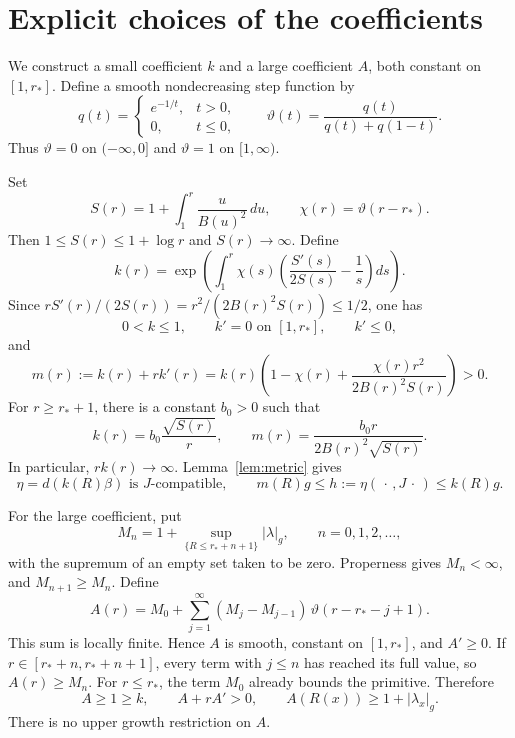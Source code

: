 \documentclass[11pt,a4paper]{article}
\theoremstyle{remark}
\newcommand{\abs}[1]{\lvert #1\rvert}
\numberwithin{equation}{section}
\begin{document}
\section{Explicit choices of the coefficients}

We construct a small coefficient $k$ and a large coefficient $A$, both constant on $[1,r_*]$. Define a smooth nondecreasing step function by
\[
q(t)=\begin{cases}e^{-1/t},&t>0,\\0,&t\le0,\end{cases}
\qquad \vartheta(t)=\frac{q(t)}{q(t)+q(1-t)}.
\]
Thus $\vartheta=0$ on $(-\infty,0]$ and $\vartheta=1$ on $[1,\infty)$.

Set
\begin{equation}\label{eq:S}
S(r)=1+\int_1^r\frac{u}{B(u)^2}\,du,
\qquad \chi(r)=\vartheta(r-r_*).
\end{equation}
Then $1\le S(r)\le1+\log r$ and $S(r)\to\infty$. Define
\begin{equation}\label{eq:k}
\boxed{\displaystyle
k(r)=\exp\left(\int_1^r\chi(s)
\left(\frac{S'(s)}{2S(s)}-\frac1s\right)ds\right).}
\end{equation}
Since $rS'(r)/(2S(r))=r^2/(2B(r)^2S(r))\le1/2$, one has
\begin{equation}\label{eq:kproperties}
0<k\le1,\qquad k'=0\text{ on }[1,r_*],\qquad k'\le0,
\end{equation}
and
\begin{equation}\label{eq:m}
m(r):=k(r)+rk'(r)
=k(r)\left(1-\chi(r)+\frac{\chi(r)r^2}{2B(r)^2S(r)}\right)>0.
\end{equation}
For $r\ge r_*+1$, there is a constant $b_0>0$ such that
\begin{equation}\label{eq:kasymptotic}
k(r)=b_0\frac{\sqrt{S(r)}}r,
\qquad m(r)=\frac{b_0r}{2B(r)^2\sqrt{S(r)}}.
\end{equation}
In particular, $rk(r)\to\infty$. Lemma~\ref{lem:metric} gives
\begin{equation}\label{eq:smallmetric}
\eta=d(k(R)\beta)\text{ is }J\text{-compatible},
\qquad m(R)g\le h:=\eta(\,\cdot\,,J\,\cdot\,)\le k(R)g.
\end{equation}

For the large coefficient, put
\begin{equation}\label{eq:Mn}
M_n=1+\sup_{\{R\le r_*+n+1\}}\abs{\lambda}_g,
\qquad n=0,1,2,\ldots,
\end{equation}
with the supremum of an empty set taken to be zero. Properness gives $M_n<\infty$, and $M_{n+1}\ge M_n$. Define
\begin{equation}\label{eq:A}
\boxed{\displaystyle
A(r)=M_0+\sum_{j=1}^\infty(M_j-M_{j-1})\,
\vartheta(r-r_*-j+1).}
\end{equation}
This sum is locally finite. Hence $A$ is smooth, constant on $[1,r_*]$, and $A'\ge0$. If $r\in[r_*+n,r_*+n+1]$, every term with $j\le n$ has reached its full value, so $A(r)\ge M_n$. For $r\le r_*$, the term $M_0$ already bounds the primitive. Therefore
\begin{equation}\label{eq:Aproperties}
A\ge1\ge k,\qquad A+rA'>0,
\qquad A(R(x))\ge1+\abs{\lambda_x}_g.
\end{equation}
There is no upper growth restriction on $A$.
\end{document}
